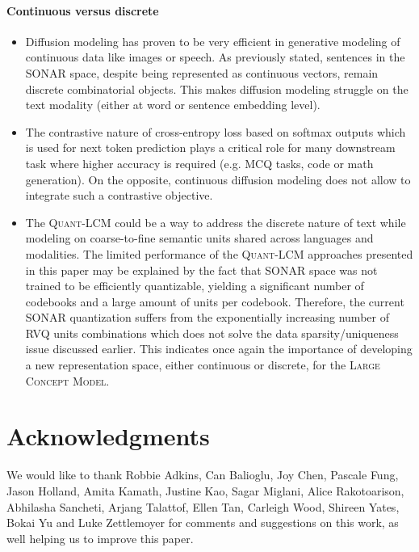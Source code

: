 \documentclass[twoside,11pt]{fairmeta}
\newcommand{\sonar}{\textsc{SONAR}\xspace}
\newcommand{\LCM}{\textsc{Large Concept Model}\xspace}
\newcommand{\qlcm}{\textsc{Quant-LCM}\xspace}
\begin{document}
\vspace*{-4mm}
\paragraph{Continuous versus discrete} 
\begin{itemize}
    \item  Diffusion modeling has proven to be very efficient in generative modeling of continuous data like images or speech. As previously stated, sentences in the \sonar space, despite being represented as continuous vectors, remain discrete combinatorial objects. This makes diffusion modeling struggle on the text modality (either at word or sentence embedding level).
    \vspace{-0.5mm}
    \item The contrastive nature of cross-entropy loss based on softmax outputs which is used for next token prediction plays a critical role for many downstream task where higher accuracy is required (e.g. MCQ tasks, code or math generation).
    On the opposite, continuous diffusion modeling does not allow to integrate such a contrastive objective.
    \vspace{-0.5mm}
    \item The \qlcm could be a way to address the discrete nature of text while modeling on coarse-to-fine semantic units shared across languages and modalities. The limited performance of the \qlcm approaches presented in this paper may be explained by the fact that \sonar space was not trained to be efficiently quantizable, yielding a significant number of codebooks and a large amount of units per codebook. Therefore, the current \sonar quantization suffers from the exponentially increasing number of RVQ units combinations which does not solve the data sparsity/uniqueness issue discussed earlier. 
    This indicates once again the importance of developing a new representation space, either continuous or discrete, for the \LCM.  

\end{itemize}



\section{Acknowledgments}
We would like to thank
Robbie Adkins,
Can Balioglu,
Joy Chen,
Pascale Fung,
Jason Holland,
Amita Kamath,
Justine Kao,
Sagar Miglani,
Alice Rakotoarison,
Abhilasha Sancheti,
Arjang Talattof,
Ellen Tan,
Carleigh Wood,
Shireen Yates,
Bokai Yu and
Luke Zettlemoyer
for comments and suggestions on this work, as well helping us to improve this paper.
\end{document}
